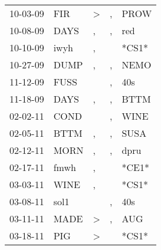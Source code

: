 \begin{supertabular}{p{0.07\textwidth}p{0.06\textwidth}p{0.02\textwidth}p{0.02\textwidth}p{0.06\textwidth}}
          10-03-09\textsuperscript{} &            FIR\textsuperscript{} &     \textgreater &             , &           PROW\textsuperscript{} \\
          10-08-09\textsuperscript{} &           DAYS\textsuperscript{} &                , &             , &            red\textsuperscript{} \\
          10-10-09\textsuperscript{} &           iwyh\textsuperscript{} &                , &               &                            *CS1* \\
          10-27-09\textsuperscript{} &           DUMP\textsuperscript{} &                , &             , &           NEMO\textsuperscript{} \\
          11-12-09\textsuperscript{} &           FUSS\textsuperscript{} &                  &             , &            40s\textsuperscript{} \\
          11-18-09\textsuperscript{} &           DAYS\textsuperscript{} &                , &             , &           BTTM\textsuperscript{} \\
          02-02-11\textsuperscript{} &           COND\textsuperscript{} &                  &             , &           WINE\textsuperscript{} \\
          02-05-11\textsuperscript{} &           BTTM\textsuperscript{} &                , &             , &           SUSA\textsuperscript{} \\
          02-12-11\textsuperscript{} &           MORN\textsuperscript{} &                , &             , &           dpru\textsuperscript{} \\
          02-17-11\textsuperscript{} &           fmwh\textsuperscript{} &                , &               &                            *CE1* \\
          03-03-11\textsuperscript{} &           WINE\textsuperscript{} &                , &               &                            *CS1* \\
          03-08-11\textsuperscript{} &           sol1\textsuperscript{} &                  &             , &            40s\textsuperscript{} \\
          03-11-11\textsuperscript{} &           MADE\textsuperscript{} &     \textgreater &             , &            AUG\textsuperscript{} \\
          03-18-11\textsuperscript{} &            PIG\textsuperscript{} &     \textgreater &               &                            *CS1* \\

\end{supertabular}
